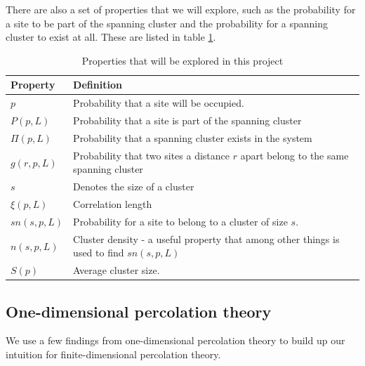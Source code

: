 \documentclass[a4paper,reprint,floatfix,amsmath,amssymb,aps,pra]{revtex4-1}
\begin{document}
There are also a set of properties that we will explore, such as the probability for a site to be part of the spanning cluster and the probability for a spanning cluster to exist at all. These are listed in table \ref{tab:properties}.
\begingroup
\begin{table}[ht]
\setlength\extrarowheight{4pt} %
\begin{ruledtabular}
\begin{tabular}{l p{}}
Property       &                  Definition \\
\hline
$p$             &       Probability that a site will be occupied. \\
$P(p, L)$       &       Probability that a site is part of the spanning cluster \\
$\Pi(p,L)$      &       Probability that a spanning cluster exists in the system \\
$g(r,p,L)$      &       Probability that two sites a distance $r$ apart belong to the same spanning cluster \\
$s$             &       Denotes the size of a cluster \\
$\xi(p,L)$      &       Correlation length \\
$sn(s,p,L)$     &       Probability for a site to belong to a cluster of size $s$. \\
$n(s,p,L)$      &       Cluster density - a useful property that among other things is used to find $sn(s,p,L)$ \\
$S(p)$          &       Average cluster size.

\end{tabular}
\end{ruledtabular}
\caption{Properties that will be explored in this project}
\label{tab:properties}
\end{table}
\endgroup

\subsection{One-dimensional percolation theory}

We use a few findings from one-dimensional percolation theory to build up our intuition for finite-dimensional percolation theory.
\end{document}
